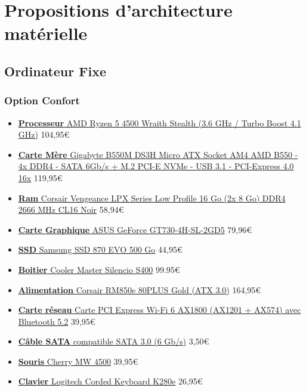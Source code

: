 \chapter{Propositions d'architecture matérielle}

\section{Ordinateur Fixe}

\subsection{Option Confort}

\begin{itemize}
	\item \href{https://www.ldlc.com/fiche/PB00497548.html}{\textbf{Processeur} AMD Ryzen 5 4500 Wraith Stealth (3.6 GHz / Turbo Boost 4.1 GHz)} 104,95\euro
	\item \href{https://www.ldlc.com/fiche/PB00346172.html}{\textbf{Carte Mère} Gigabyte B550M DS3H Micro ATX Socket AM4 AMD B550 - 4x DDR4 - SATA 6Gb/s + M.2 PCI-E NVMe - USB 3.1 - PCI-Express 4.0 16x} 119,95\euro
	\item \href{https://www.ldlc.com/fiche/PB00191551.html}{\textbf{Ram} Corsair Vengeance LPX Series Low Profile 16 Go (2x 8 Go) DDR4 2666 MHz CL16 Noir} 58,94\euro
	\item \href{https://www.ldlc.com/fiche/PB00462561.html}{\textbf{Carte Graphique} ASUS GeForce GT730-4H-SL-2GD5} 79,96\euro
	\item \href{https://www.ldlc.com/fiche/PB00402115.html}{\textbf{SSD} Samsung SSD 870 EVO 500 Go} 44,95\euro
	\item \href{https://www.ldlc.com/fiche/PB00275652.html}{\textbf{Boitier} Cooler Master Silencio S400} 99.95\euro
	\item \href{https://www.ldlc.com/fiche/PB00548770.html}{\textbf{Alimentation} Corsair RM850e 80PLUS Gold (ATX 3.0)} 164,95\euro
	\item \href{https://www.ldlc.com/fiche/PB00487856.html}{\textbf{Carte réseau} Carte PCI Express Wi-Fi 6 AX1800 (AX1201 + AX574) avec Bluetooth 5.2} 39,95\euro
	\item \href{https://www.ldlc.com/fiche/PB00016236.html}{\textbf{Câble SATA} compatible SATA 3.0 (6 Gb/s)} 3,50\euro
	\item \href{https://www.ldlc.com/fiche/PB00243882.html}{\textbf{Souris} Cherry MW 4500} 39,95\euro
	\item \href{https://www.ldlc.com/fiche/PB00242405.html}{\textbf{Clavier} Logitech Corded Keyboard K280e} 26,95\euro

\end{itemize}
